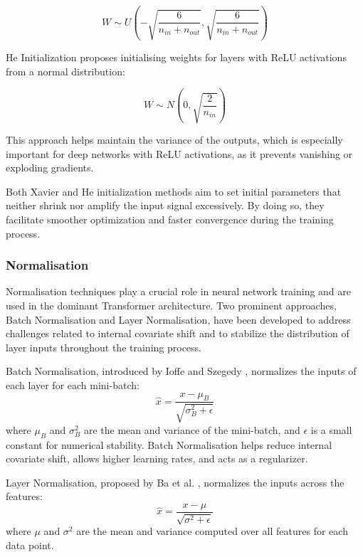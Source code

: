\documentclass[a4paper, oneside]{discothesis}
\begin{document}
\begin{equation}
    W \sim U\left(-\sqrt{\frac{6}{n_{in} + n_{out}}}, \sqrt{\frac{6}{n_{in} + n_{out}}}\right)
\end{equation}

He Initialization \cite{he2015delvingdeeprectifierssurpassing} proposes initialising weights for layers with ReLU activations from a normal distribution:

\begin{equation}
    W \sim N\left(0, \sqrt{\frac{2}{n_{in}}}\right)
\end{equation}

This approach helps maintain the variance of the outputs, which is especially important for deep networks with ReLU activations, as it prevents vanishing or exploding gradients.

Both Xavier and He initialization methods aim to set initial parameters that neither shrink nor amplify the input signal excessively. By doing so, they facilitate smoother optimization and faster convergence during the training process.

\subsubsection{Normalisation}

Normalisation techniques play a crucial role in neural network training and are used in the dominant Transformer architecture. Two prominent approaches, Batch Normalisation and Layer Normalisation, have been developed to address challenges related to internal covariate shift and to stabilize the distribution of layer inputs throughout the training process.

Batch Normalisation, introduced by Ioffe and Szegedy \cite{ioffe2015batch}, normalizes the inputs of each layer for each mini-batch:
\begin{equation}
    \hat{x} = \frac{x - \mu_B}{\sqrt{\sigma_B^2 + \epsilon}}
\end{equation}
where $\mu_B$ and $\sigma_B^2$ are the mean and variance of the mini-batch, and $\epsilon$ is a small constant for numerical stability. Batch Normalisation helps reduce internal covariate shift, allows higher learning rates, and acts as a regularizer.

Layer Normalisation, proposed by Ba et al. \cite{ba2016layer}, normalizes the inputs across the features:
\begin{equation}
    \hat{x} = \frac{x - \mu}{\sqrt{\sigma^2 + \epsilon}}
\end{equation}
where $\mu$ and $\sigma^2$ are the mean and variance computed over all features for each data point.
\end{document}
